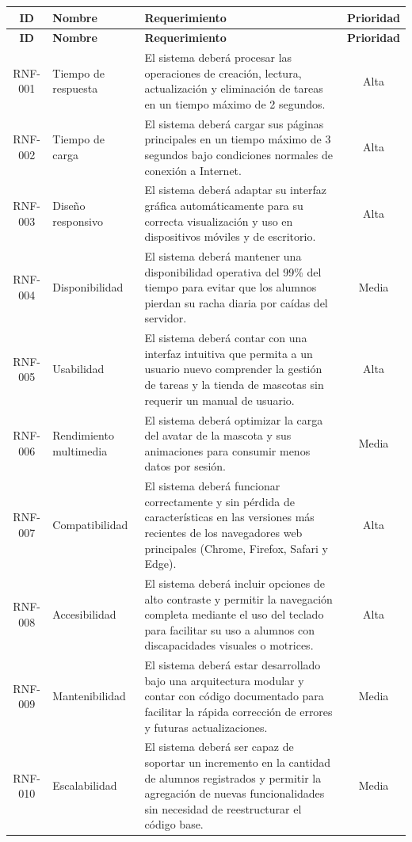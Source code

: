 \documentclass[12pt,letterpaper]{article}
\begin{document}
\begin{xltabular}{\linewidth}{| c | >{\raggedright\arraybackslash}p{3.5cm} | X | c |}
    \hline
    \textbf{ID} & \textbf{Nombre} & \textbf{Requerimiento} & \textbf{Prioridad} \\ \hline
\endfirsthead
    \hline
    \textbf{ID} & \textbf{Nombre} & \textbf{Requerimiento} & \textbf{Prioridad} \\ \hline
\endhead
    RNF-001 & Tiempo de respuesta & El sistema deberá procesar las operaciones de creación, lectura, actualización y eliminación de tareas en un tiempo máximo de 2 segundos. & Alta \\ \hline
    RNF-002 & Tiempo de carga & El sistema deberá cargar sus páginas principales en un tiempo máximo de 3 segundos bajo condiciones normales de conexión a Internet. & Alta \\ \hline
    RNF-003 & Diseño responsivo & El sistema deberá adaptar su interfaz gráfica automáticamente para su correcta visualización y uso en dispositivos móviles y de escritorio. & Alta \\ \hline
    RNF-004 & Disponibilidad & El sistema deberá mantener una disponibilidad operativa del 99\% del tiempo para evitar que los alumnos pierdan su racha diaria por caídas del servidor. & Media \\ \hline
    RNF-005 & Usabilidad & El sistema deberá contar con una interfaz intuitiva que permita a un usuario nuevo comprender la gestión de tareas y la tienda de mascotas sin requerir un manual de usuario. & Alta \\ \hline
    RNF-006 & Rendimiento multimedia & El sistema deberá optimizar la carga del avatar de la mascota y sus animaciones para consumir menos datos por sesión. & Media \\ \hline
    RNF-007 & Compatibilidad & El sistema deberá funcionar correctamente y sin pérdida de características en las versiones más recientes de los navegadores web principales (Chrome, Firefox, Safari y Edge). & Alta \\ \hline
    RNF-008 & Accesibilidad & El sistema deberá incluir opciones de alto contraste y permitir la navegación completa mediante el uso del teclado para facilitar su uso a alumnos con discapacidades visuales o motrices. & Alta \\ \hline
    RNF-009 & Mantenibilidad & El sistema deberá estar desarrollado bajo una arquitectura modular y contar con código documentado para facilitar la rápida corrección de errores y futuras actualizaciones. & Media \\ \hline
    RNF-010 & Escalabilidad & El sistema deberá ser capaz de soportar un incremento en la cantidad de alumnos registrados y permitir la agregación de nuevas funcionalidades sin necesidad de reestructurar el código base. & Media \\ \hline
\end{xltabular}
\end{document}
